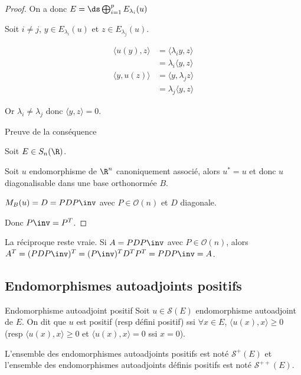 \begin{proof}
    On a donc $E = \ds \bigoplus_{i = 1}^p E_{\lambda_i}(u)$

    Soit $i \neq j$, $y \in E_{\lambda_i}(u)$ et $z \in E_{\lambda_j}(u)$.

    \begin{align}
        \langle u(y), z \rangle & = \langle \lambda_i y, z \rangle \\
        & = \lambda_i \langle y, z \rangle \\
        \langle y, u(z) \rangle & = \langle y, \lambda_j z \rangle \\
        & = \lambda_j \langle y, z \rangle
    \end{align}

    Or $\lambda_i \neq \lambda_j$ donc $\langle y, z \rangle = 0$. 

    \lvspace Preuve de la conséquence 

    Soit $E \in S_n(\R)$. 

    Soit $u$ endomorphisme de $\R^n$ canoniquement associé, alors $u^* = u$ et donc $u$ diagonalisable 
    dans une base orthonormée $B$.

    $M_B(u) = D = PDP\inv$ avec $P \in \mathcal O(n)$ et $D$ diagonale.

    Donc $P\inv = P^T$. 
\end{proof}

\begin{remarque}
    La réciproque reste vraie. Si $A = PDP\inv$ avec $P \in \mathcal O(n)$, alors 
    $A^T = (PDP\inv)^T = (P\inv)^T D^T P^T = PDP\inv = A$.
\end{remarque}

\subsection{Endomorphismes autoadjoints positifs}

\begin{definition}{Endomorphisme autoadjoint positif}{}
    Soit $u \in \mathscr S(E)$ endomorphisme autoadjoint de $E$. On dit que 
    $u$ est positif (resp défini positif) ssi $\forall x \in E$, 
    $\langle u(x), x \rangle \geqslant 0$ (resp $\langle u(x), x \rangle  \geqslant 0$ et 
    $\langle u(x), x \rangle = 0$ ssi $x = 0$).

    L'ensemble des endomorphismes autoadjoints positifs est noté 
    $\mathscr S^+(E)$ et l'ensemble des endomorphismes autoadjoints définis positifs est noté $\mathscr S^{++}(E)$.
\end{definition}

